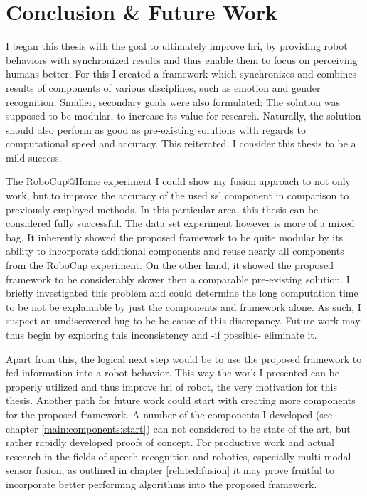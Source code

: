 

\chapter{Conclusion \& Future Work}
\label{conclusion}

I began this thesis with the goal to ultimately improve \gls{hri}, by providing robot behaviors with synchronized results and thus enable them to focus on perceiving humans better.
For this I created a framework which synchronizes and combines results of components of various disciplines, such as emotion and gender recognition.
Smaller, secondary goals were also formulated:
The solution was supposed to be modular, to increase its value for research.
Naturally, the solution should also perform as good as pre-existing solutions with regards to computational speed and accuracy.
This reiterated, I consider this thesis to be a mild success.

The RoboCup@Home experiment I could show my fusion approach to not only work, but to improve the accuracy of the used \gls{ssl} component in comparison to previously employed methods.
In this particular area, this thesis can be considered fully successful.
The data set experiment however is more of a mixed bag.
It inherently showed the proposed framework to be quite modular by its ability to incorporate additional components and reuse nearly all components from the RoboCup experiment.
On the other hand, it showed the proposed framework to be considerably slower then a comparable pre-existing solution.
I briefly investigated this problem and could determine the long computation time to be not be explainable by just the components and framework alone.
As such, I suspect an undiscovered bug to be he cause of this discrepancy.
Future work may thus begin by exploring this inconsistency and -if possible- eliminate it.


Apart from this, the logical next step would be to use the proposed framework to fed information into a robot behavior.
This way the work I presented can be properly utilized and thus improve \gls{hri} of robot, the very motivation for this thesis.
Another path for future work could start with creating more components for the proposed framework.
A number of the components I developed (see chapter \ref{main:components:start}) can not considered to be state of the art, but rather rapidly developed proofs of concept.
For productive work and actual research in the fields of speech recognition and robotics, especially multi-modal sensor fusion, as outlined in chapter \ref{related:fusion} it may prove fruitful to incorporate better performing algorithms into the proposed framework.

